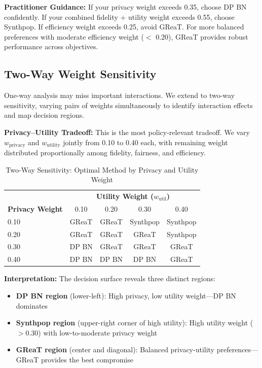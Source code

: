 \documentclass[12pt,a4paper]{article}
\begin{document}
\textbf{Practitioner Guidance:} If your privacy weight exceeds 0.35, choose DP BN confidently. If your combined fidelity + utility weight exceeds 0.55, choose Synthpop. If efficiency weight exceeds 0.25, avoid GReaT. For more balanced preferences with moderate efficiency weight ($<$ 0.20), GReaT provides robust performance across objectives.

\subsection{Two-Way Weight Sensitivity}

One-way analysis may miss important interactions. We extend to two-way sensitivity, varying pairs of weights simultaneously to identify interaction effects and map decision regions.

\textbf{Privacy--Utility Tradeoff:} This is the most policy-relevant tradeoff. We vary $w_{\text{privacy}}$ and $w_{\text{utility}}$ jointly from 0.10 to 0.40 each, with remaining weight distributed proportionally among fidelity, fairness, and efficiency.

\begin{table}[htbp]
\centering
\caption{Two-Way Sensitivity: Optimal Method by Privacy and Utility Weight}
\label{tab:two_way}
\begin{tabular}{@{}l|cccc@{}}
\toprule
& \multicolumn{4}{c}{\textbf{Utility Weight ($w_{\text{util}}$)}} \\
\textbf{Privacy Weight} & 0.10 & 0.20 & 0.30 & 0.40 \\
\midrule
0.10 & GReaT & GReaT & Synthpop & Synthpop \\
0.20 & GReaT & GReaT & GReaT & Synthpop \\
0.30 & DP BN & GReaT & GReaT & GReaT \\
0.40 & DP BN & DP BN & DP BN & GReaT \\
\bottomrule
\end{tabular}
\end{table}

\textbf{Interpretation:} The decision surface reveals three distinct regions:
\begin{itemize}
    \item \textbf{DP BN region} (lower-left): High privacy, low utility weight---DP BN dominates
    \item \textbf{Synthpop region} (upper-right corner of high utility): High utility weight ($> 0.30$) with low-to-moderate privacy weight
    \item \textbf{GReaT region} (center and diagonal): Balanced privacy-utility preferences---GReaT provides the best compromise
\end{itemize}
\end{document}
